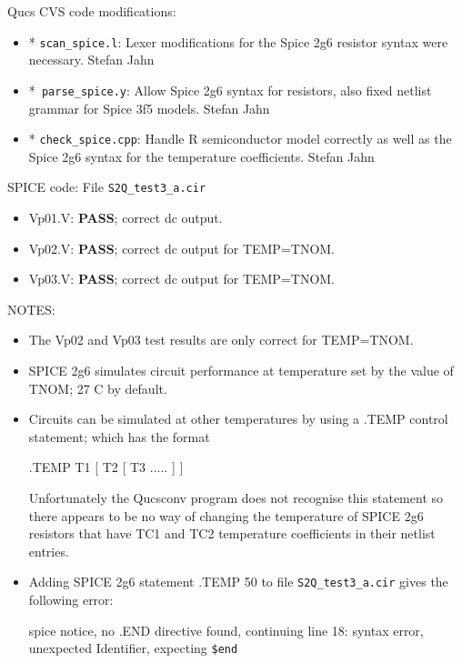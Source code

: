 \begin{flushleft}

Qucs CVS code modifications:   
\begin{flushleft}
\begin{itemize}
 \item  * \verb|scan_spice.l|: Lexer modifications for the Spice 2g6 resistor
        syntax were necessary. Stefan Jahn
 \item   *\verb| parse_spice.y|: Allow Spice 2g6 syntax for resistors, also
        fixed netlist grammar for Spice 3f5 models. Stefan Jahn
 \item  * \verb|check_spice.cpp|: Handle R semiconductor model correctly as
        well as the Spice 2g6 syntax for the temperature coefficients. Stefan Jahn

\end{itemize}             \end{flushleft}

SPICE code: File \verb|S2Q_test3_a.cir|

\begin{itemize}
 \item Vp01.V: \textbf{PASS}; correct dc output.
 \item Vp02.V: \textbf{PASS}; correct dc output for TEMP=TNOM.
 \item Vp03.V: \textbf{PASS}; correct dc output for TEMP=TNOM.
 \end{itemize}

\begin{flushleft}
 NOTES:
\begin{itemize}
 \item The Vp02 and Vp03 test results are only correct for TEMP=TNOM.
 \item SPICE 2g6 simulates circuit performance at temperature set by the value of TNOM; 27 \degree C by default.
 \item Circuits can be simulated at other temperatures by using a .TEMP control statement; which has the format


 .TEMP   T1 [ T2 [ T3 ..... ] ]


 Unfortunately the Qucsconv program does not recognise this statement so there appears to be no way of changing the temperature of SPICE 2g6 resistors that have TC1 and TC2 temperature coefficients in their netlist entries.
\item Adding SPICE 2g6 statement .TEMP 50 to file \verb|S2Q_test3_a.cir| gives the following error:

spice notice, no .END directive found, continuing 
line 18: syntax error, unexpected Identifier, expecting \verb|$end| 
\end{itemize}


\end{flushleft}
\end{flushleft}
